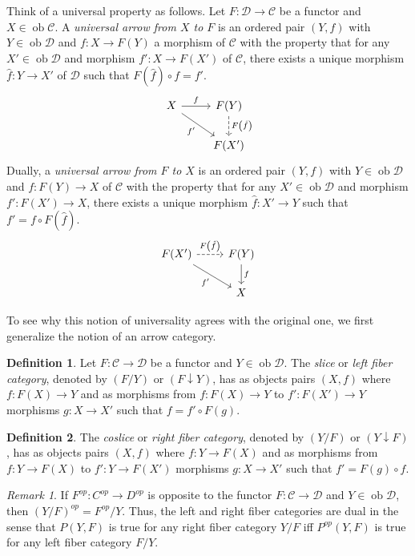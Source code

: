 \documentclass[10pt,letterpaper,cm]{nupset}
\theoremstyle{definition}
\newtheorem{definition}{Definition}
\theoremstyle{theorem}
\theoremstyle{remark}
\newtheorem{remark}{Remark}
\newcommand{\1}{\mathbf{1}}
\renewcommand{\c}{\mathscr{C}}
\renewcommand{\d}{\mathscr{D}}
\newcommand{\0}{\vec 0}
\DeclareMathOperator{\ob}{ob}
\begin{document}
Think of a universal property as follows.  Let $F : \d \to \c$ be a functor and $X \in \ob \c$. A \textit{universal arrow from $X$ to $F$} is an ordered pair $(Y, f)$ with $Y \in \ob \d$ and $f : X \to F(Y)$ a morphism of $\c$ with the property that for any $X' \in \ob \d$ and morphism $f' : X \to F(X')$ of $\c$, there exists a unique morphism $\hat{f} : Y \to X'$ of $\d$ such that $F\left(\hat{f}\right) \circ f = f'$.
\[ \begin{tikzcd}
X \arrow[r, "f"] \arrow[swap, dr,  " f' "] & F(Y) \arrow[d, dashed, "F\left(\hat{f}\right)"] \\%
 & F(X')
\end{tikzcd}
\]
Dually, a \textit{universal arrow from $F$ to $X$} is an ordered pair $(Y, f)$ with $Y \in \ob \d$ and $f: F(Y) \to X$ of $\c$ with the property that for any $X' \in \ob \d$ and morphism $f' : F(X') \to X$, there exists a unique morphism $\hat{f}: X' \to Y$ such that $f' = f \circ F\left(\hat{f}\right)$.
\[ \begin{tikzcd}
F(X') \arrow[r, dashed, "F\left(\hat{f}\right)"] \arrow[swap, dr,  " f' "] & F(Y) \arrow[d, "f"] \\%
 & X
\end{tikzcd}
\]



To see why this notion of universality agrees with the original one, we first generalize the notion of an arrow category.

\begin{definition}
Let $F: \c \to \d$ be a functor and $Y \in \ob \d$. The \textit{slice} or \textit{left fiber category}, denoted by $(F/Y)$ or $(F \downarrow Y)$, has as objects pairs $(X, f)$ where $f: F(X) \to Y$ and as morphisms from $f : F(X) \to Y$ to $f' : F(X') \to Y$ morphisms $g : X \to X'$ such that $f = f' \circ F(g).$ 
\end{definition}

\begin{definition}
The \textit{coslice} or \textit{right fiber category}, denoted by $(Y/F)$ or $(Y \downarrow F)$, has as objects pairs $(X, f)$ where $f: Y\to F(X)$ and as morphisms from $f :  Y \to F(X)$ to $f' : Y \to F(X')$ morphisms $g : X \to X'$ such that $f' = F(g) \circ f.$
\end{definition}

\begin{remark}
If $F^{op}:C^{op} \to D^{op}$ is opposite to the functor $F: \c \to \d$ and $Y \in \ob \d$, then $(Y/F)^{op} = {F^{op}}/{Y}$. Thus, the left and right fiber categories are dual in the sense that $P(Y, F)$ is true for any right fiber category ${Y}/{F}$ iff $P^{op}(Y, F)$ is true for any left fiber category ${F}/{Y}$. 
\end{remark}
\end{document}
